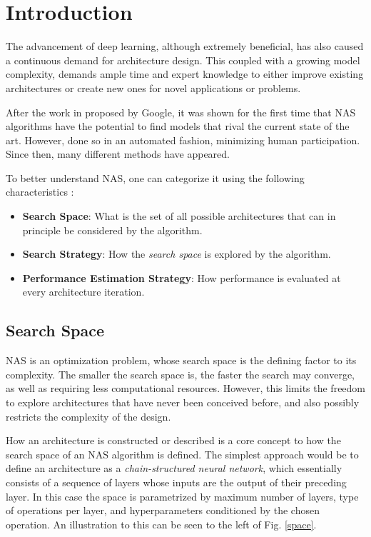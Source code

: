 \documentclass[10pt,        %
               a4paper,     %
               journal,     %
               ]{IEEEtran}
\begin{document}
\section{Introduction}
The advancement of deep learning, although extremely beneficial, has also caused a continuous demand for
architecture design. This coupled with a growing model complexity, demands ample time and expert knowledge to
either improve existing architectures or create new ones for novel applications or problems.


After the work in \cite{zoph2016neural} proposed by Google, it was shown for the first time that NAS algorithms
have the potential to find models that rival the current state of the art. However, done so in an automated fashion, minimizing
human participation. Since then, many different methods have appeared.

To better understand NAS, one can categorize it using the following characteristics \cite{elsken2019neural}:
\begin{itemize}
    \item \textbf{Search Space}: What is the set of all possible architectures that can in principle be considered
    by the algorithm.

    \item \textbf{Search Strategy}: How the \textit{search space} is explored by the algorithm.

    \item \textbf{Performance Estimation Strategy}: How performance is evaluated at every architecture iteration.
\end{itemize}

\subsection{Search Space}
\label{search}
NAS is an optimization problem, whose search space is the defining factor to its complexity.
The smaller the search space is, the faster the search may converge,
as well as requiring less computational resources. However, this limits the freedom to
explore architectures that have never been conceived before, and also possibly restricts the complexity of the design.

How an architecture is constructed or described is a core concept to how the search space of an NAS algorithm is defined.
The simplest approach would be to define an architecture as a \textit{chain-structured neural network}, which essentially consists of a
sequence of layers whose inputs are the output of their preceding layer. In this case the space is parametrized by maximum number
of layers, type of operations per layer, and hyperparameters conditioned by the chosen operation. An illustration to this can be
seen to the left of Fig. \ref{space}.
\end{document}
